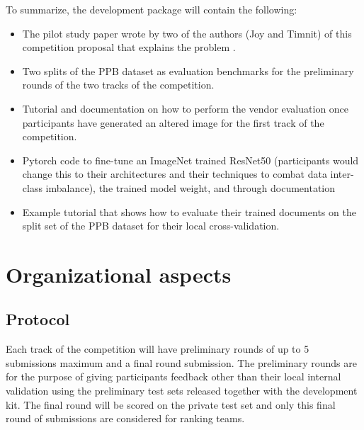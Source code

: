 \documentclass[11pt, oneside]{article}
\makeatletter
\let\@internalcite\cite
\def\cite{\def\citeauthoryear##1##2{##1, ##2}\@internalcite}
\makeatother
\begin{document}
To summarize, the development package will contain the following:

\begin{itemize}
	\item The pilot study paper wrote by two of the authors (Joy and Timnit) of 
	this competition proposal that explains the problem 
	\cite{buolamwini2018gender}.
	\item Two splits of the PPB dataset as evaluation benchmarks for the 
	preliminary rounds of the two tracks of the competition.
	\item Tutorial and documentation on how to perform the vendor evaluation 
	once participants have generated an altered image for the first track of 
	the competition.
	\item Pytorch code to fine-tune an ImageNet trained ResNet50 (participants 
	would change this to their architectures and their techniques to combat 
	data inter-class imbalance), the trained model weight, and through 
	documentation
	\item Example tutorial that shows how to evaluate their trained documents 
	on the split set of the PPB dataset for their local cross-validation.
\end{itemize}

\section{Organizational aspects}
\subsection{Protocol}
\label{sec:protocol}

Each track of the competition will have preliminary rounds of up to 5 
submissions maximum and a final round submission. The preliminary rounds are 
for the purpose of giving participants feedback other than their local internal 
validation using the preliminary test sets released together with the 
development kit. The final round will be scored on the private test set and 
only this final round of submissions are considered for ranking teams.
\end{document}
